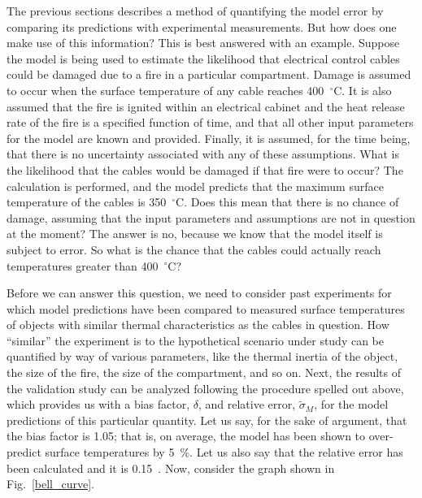 The previous sections describes a method of quantifying the model error by comparing its predictions with experimental measurements. But how does one make use of this
information? This is best answered with an example. Suppose the model is being used to estimate the likelihood that electrical control cables could be damaged due to
a fire in a particular compartment. Damage is assumed to occur when the surface temperature of any cable reaches 400~$^\circ$C. It is also assumed that the fire is
ignited within an electrical cabinet and the heat release rate of the fire is a specified function of time, and that all other input
parameters for the model are known and provided. Finally, it is assumed, for the time being, that there is no uncertainty
associated with any of these assumptions. What is the likelihood that the cables would be damaged if that fire were to occur? The calculation is performed, and the
model predicts that the maximum surface temperature of the cables is 350~$^\circ$C. Does this mean that there is no chance of damage, assuming that the input parameters
and assumptions are not in question at the moment? The answer is no, because we know that the model itself is subject to error. So what is the chance that the
cables could actually reach temperatures greater than 400~$^\circ$C?

Before we can answer this question, we need to consider past experiments for which model predictions have been compared to measured surface temperatures of objects
with similar thermal characteristics as the cables in question. How ``similar'' the experiment is to the hypothetical scenario under study can be quantified by way of
various parameters, like the thermal inertia of the object, the size of the fire, the size of the compartment, and so on. Next, the results of the validation study can be
analyzed following the procedure spelled out above, which provides us with a bias factor, $\delta$, and relative error, $\tilde{\sigma}_M$, for the model
predictions of this particular quantity. Let us say, for the sake of argument, that the bias factor is 1.05; that is, on average, the model has been shown to over-predict
surface temperatures by 5~\%. Let us also say that the relative error has been calculated and it is 0.15~.
Now, consider the graph shown in Fig.~\ref{bell_curve}.


